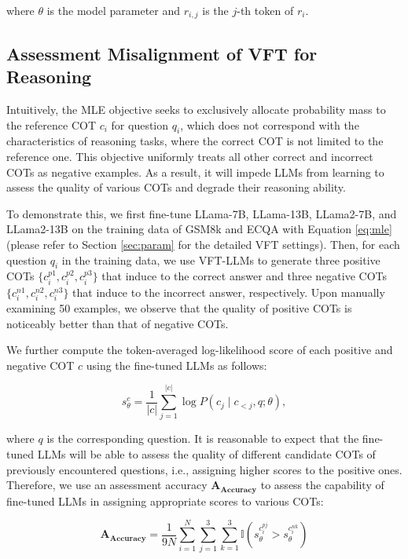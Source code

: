 where $\theta$ is the model parameter and $r_{i,j}$ is the $j$-th token of $r_i$.

\subsection{Assessment Misalignment of VFT for Reasoning} Intuitively, the MLE objective seeks to exclusively allocate probability mass to the reference COT $c_i$ for question $q_i$, which does not correspond with the characteristics of reasoning tasks, where the correct COT is not limited to the reference one. This objective uniformly treats all other correct and incorrect COTs as negative examples. As a result, it will impede LLMs from learning to assess the quality of various COTs and degrade their reasoning ability.

To demonstrate this, we first fine-tune LLama-7B, LLama-13B, LLama2-7B, and LLama2-13B on the training data of GSM8k and ECQA with Equation \ref{eq:mle} (please refer to Section \ref{sec:param} for the detailed VFT settings). Then, for each question $q_i$ in the training data, we use VFT-LLMs to generate three positive COTs $\{c^{p1}_i, c_i^{p2}, c_i^{p3}\}$ that induce to the correct answer and three negative COTs  $\{c^{n1}_i, c_i^{n2}, c_i^{n3}\}$ that induce to the incorrect answer, respectively. Upon manually examining 50 examples, we observe that the quality of positive COTs is noticeably better than that of negative COTs.

We further compute the token-averaged log-likelihood score of each positive and negative COT $c$ using the fine-tuned LLMs as follows:

\begin{equation}
s_{\theta}^{c}=\frac{1}{|c|}{\sum_{j=1}^{|c|} \log P\left(c_j \mid c_{<j}, q;\theta\right)},
\label{eq:score}
\end{equation}

where $q$ is the corresponding question. It is reasonable to expect that the fine-tuned LLMs will be able to assess the quality of different candidate COTs of previously encountered questions, i.e., assigning higher scores to the positive ones. Therefore, we use an assessment accuracy $\mathbf{A_{Accuracy}}$ to assess the capability of fine-tuned LLMs in assigning appropriate scores to various COTs:

\begin{equation}
    \mathbf{A_{Accuracy}} = \frac{1}{9N}\sum_{i=1}^N\sum_{j=1}^3\sum_{k=1}^3 \mathbb{I} (s_{\theta}^{c_i^{pj}} > s_{\theta}^{c_i^{nk}})
\end{equation}

